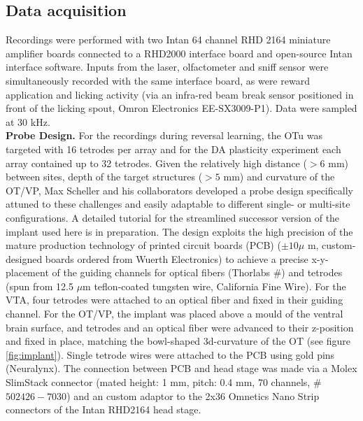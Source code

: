 \subsection{Data acquisition}Recordings were performed with two Intan 64 channel RHD 2164 miniature amplifier boards connected to a RHD2000 interface board and open-source Intan interface software. Inputs from the laser, olfactometer and sniff sensor were simultaneously recorded with the same interface board, as were reward application and licking activity (via an infra-red beam break sensor positioned in front of the licking spout, Omron Electronics EE-SX3009-P1). Data were sampled at 30 kHz.\\\textbf{Probe Design.} For the recordings during reversal learning, the OTu was targeted with 16 tetrodes per array and for the DA plasticity experiment each array contained up to 32 tetrodes. Given the relatively high distance ($>6$ mm) between sites, depth of the target structures ($>5$ mm) and curvature of the OT/VP, Max Scheller and his collaborators developed a probe design specifically attuned to these challenges and easily adaptable to different single- or multi-site configurations. A detailed tutorial for the streamlined successor version of the implant used here is in preparation. The design exploits the high precision of the mature production technology of printed circuit boards (PCB)  ($\pm10\mu$ m, custom-designed boards ordered from Wuerth Electronics) to achieve a precise x-y-placement of the guiding channels for optical fibers (Thorlabs \#) and tetrodes (spun from 12.5 $\mu$m teflon-coated tungsten wire, California Fine Wire). For the VTA, four tetrodes were attached to an optical fiber and fixed in their guiding channel. For the OT/VP, the implant was placed above a mould of the ventral brain surface, and tetrodes and an optical fiber were advanced to their z-position and fixed in place, matching the bowl-shaped 3d-curvature of the OT (see figure \ref{fig:implant}). Single tetrode wires were attached to the PCB using gold pins (Neuralynx). The connection between PCB and head stage was made via a Molex SlimStack connector (mated height: 1 mm, pitch: 0.4 mm, 70 channels, \# $502426-7030$) and an custom adaptor to the 2x36 Omnetics Nano Strip connectors of the Intan RHD2164 head stage.\\ 

